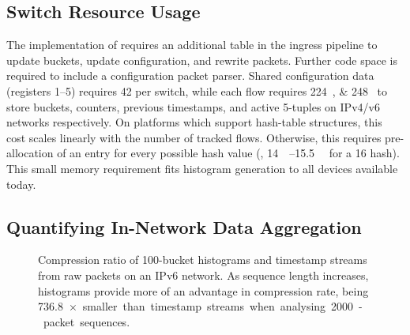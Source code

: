 \subsection{Switch Resource Usage}
The implementation of \seidr{} requires an additional table in the ingress pipeline to update buckets, update configuration, and rewrite packets.
Further code space is required to include a configuration packet parser.
Shared configuration data (registers \numrange{1}{5}) requires \SI{42}{\byte} per switch, while each flow requires \SIlist{224;248}{\byte} to store buckets, counters, previous timestamps, and active 5-tuples on IPv4/v6 networks respectively.
On platforms which support hash-table structures, this cost scales linearly with the number of tracked flows.
Otherwise, this requires pre-allocation of an entry for every possible hash value (\eg, \SIrange{14}{15.5}{\mebi\byte} for a \SI{16}{\bit} hash). This small memory requirement fits histogram generation to all devices available today.

\subsection{Quantifying In-Network Data Aggregation}

\begin{figure}
    \centering
    \caption{Compression ratio of \num{100}-bucket histograms and timestamp streams from raw packets on an IPv6 network. As sequence length increases, histograms provide more of an advantage in compression rate, being \SI{736.8}{$\times$} smaller than timestamp streams when analysing \num{2000}-packet sequences.}
    \label{fig:histo-compression}
\end{figure}


